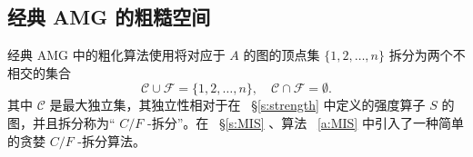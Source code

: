 \documentclass[12pt]{acta_2011xz}
\begin{document}
   \subsection{经典 AMG 的粗糙空间  }       \label{s:idealHL}     

经典 AMG 中的粗化算法使用将对应于    $A$    的图的顶点集    $ \{ 1, 2, \dots, n \} $    拆分为两个不相交的集合
   \begin{equation}\label{e:cf}
    \mathcal C\cup \mathcal F= \{ 1, 2, \dots, n \} , \quad \mathcal C\cap \mathcal F=\emptyset.
\end{equation}    其中    $\mathcal C$    是最大独立集，其独立性相对于在~    \S       \ref{s:strength}    中定义的强度算子    $S$    的图，并且拆分称为“   $C/F$    -拆分”。在~    \S       \ref{s:MIS}    、算法~    \ref{a:MIS}    中引入了一种简单的贪婪    $C/F$    -拆分算法。  
\end{document}

